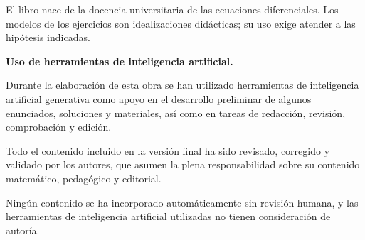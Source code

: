 El libro nace de la docencia universitaria de las ecuaciones diferenciales. Los modelos de los ejercicios son idealizaciones didácticas; su uso exige atender a las hipótesis indicadas.

\textbf{Uso de herramientas de inteligencia artificial.}

Durante la elaboración de esta obra se han utilizado herramientas de inteligencia artificial generativa como apoyo en el desarrollo preliminar de algunos enunciados, soluciones y materiales, así como en tareas de redacción, revisión, comprobación y edición.

Todo el contenido incluido en la versión final ha sido revisado, corregido y validado por los autores, que asumen la plena responsabilidad sobre su contenido matemático, pedagógico y editorial.

Ningún contenido se ha incorporado automáticamente sin revisión humana, y las herramientas de inteligencia artificial utilizadas no tienen consideración de autoría.
\clearpage
